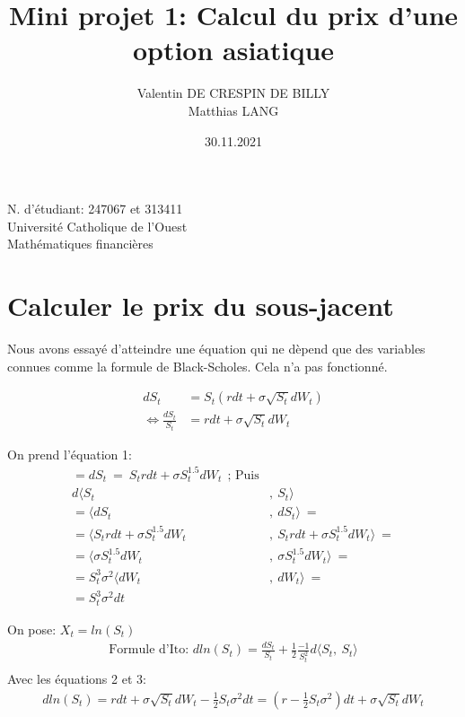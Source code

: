 \documentclass[a4paper,12pt]{scrartcl}
\title{Mini projet 1: Calcul du prix d'une option asiatique}
\author{Valentin DE CRESPIN DE BILLY \\ Matthias LANG}
\date{30.11.2021}
\begin{document}
\maketitle
\begin{center}

  \thispagestyle{empty}

  N. d'étudiant: 247067 et 313411\\
  Université Catholique de l'Ouest\\
  Mathématiques financières

\end{center}

\newpage

\section{Calculer le prix du sous-jacent}

Nous avons essayé d'atteindre une équation qui ne dèpend que des variables connues comme la formule de Black-Scholes.
Cela n'a pas fonctionné.

\begin{align}%
dS_t  &=  S_t(rdt+\sigma \sqrt{S_t} dW_t) \\
     \iff \frac{dS_t}{S_t}  &=  rdt+\sigma \sqrt{S_t} dW_t
\end{align}


On prend l'équation 1:
\begin{align*}
= dS_t~=~S_trdt+\sigma S_t^{1.5} dW_t ~~
\text{; Puis} \\
d \langle S_t &, ~ S_t\rangle \\
=\langle dS_t &,~ dS_t\rangle ~=\\
=\langle S_trdt+\sigma S_t^{1.5} dW_t &,~
         S_trdt+\sigma S_t^{1.5} dW_t \rangle ~=\\
=\langle \sigma S_t^{1.5} dW_t &,~
         \sigma S_t^{1.5} dW_t \rangle ~=\\
=S_t^3 \sigma^2 \langle dW_t &,~  dW_t \rangle ~=\\
=S_t^3 \sigma^2 dt
\end{align*}


On pose: 
$X_t = ln(S_t)$
\begin{align}
\text{Formule d'Ito: } dln(S_t) = \frac{dS_t}{S_t} + \frac{1}{2} \frac{-1}{S_t^2}d \langle S_t, ~S_t \rangle \\
\end{align}
Avec les équations 2 et 3:
\begin{align}
dln(S_t) = 
rdt + \sigma \sqrt{S_t} dW_t - \frac{1}{2}S_t \sigma^2 dt =
(r - \frac{1}{2}S_t\sigma^2)dt + \sigma\sqrt{S_t}dW_t
\end{align}
\end{document}
